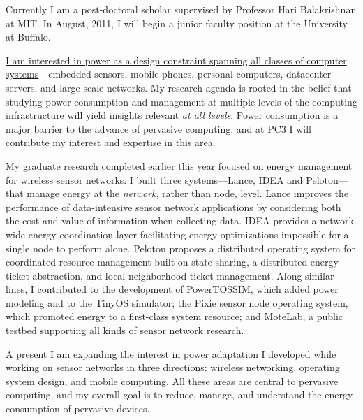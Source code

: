 \newcommand{\PhoneLab}{\textsc{PhoneLab}}


Currently I am a post-doctoral scholar supervised by Professor Hari
Balakrishnan at MIT. In August, 2011, I will begin a junior faculty position
at the University at Buffalo.


\uline{I am interested in power as a design constraint spanning all classes
of computer systems}---embedded sensors, mobile phones, personal computers,
datacenter servers, and large-scale networks. My research agenda is rooted in
the belief that studying power consumption and management at multiple levels
of the computing infrastructure will yield insights relevant \textit{at all
levels}. Power consumption is a major barrier to the advance of pervasive
computing, and at {\scshape PC3} I will contribute my interest and expertise
in this area.


My graduate research completed earlier this year focused on energy management
for wireless sensor networks. I built three systems---Lance, IDEA and
Peloton---that manage energy at the \textit{network}, rather than node,
level. Lance improves the performance of data-intensive sensor network
applications by considering both the cost and value of information when
collecting data. IDEA provides a network-wide energy coordination layer
facilitating energy optimizations impossible for a single node to perform
alone. Peloton proposes a distributed operating system for coordinated
resource management built on state sharing, a distributed energy ticket
abstraction, and local neighborhood ticket management. Along similar lines, I
contributed to the development of PowerTOSSIM, which added power modeling and
to the TinyOS simulator; the Pixie sensor node operating system, which
promoted energy to a first-class system resource; and MoteLab, a public
testbed supporting all kinds of sensor network research.


A present I am expanding the interest in power adaptation I developed while
working on sensor networks in three directions: wireless networking,
operating system design, and mobile computing. All these areas are central to
pervasive computing, and my overall goal is to reduce, manage, and understand
the energy consumption of pervasive devices.

